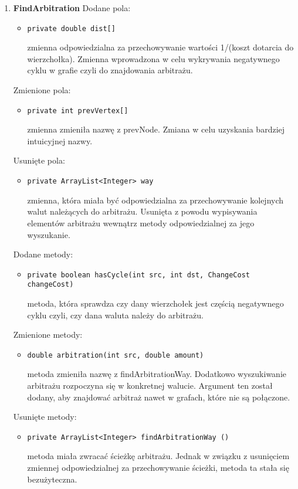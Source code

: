 \documentclass[12pt]{article}
\begin{document}
\begin{enumerate}
\item \textbf{FindArbitration}
\newline\newline
   Dodane pola:
    \begin{itemize}
        \item \begin{verbatim}private double dist[]\end{verbatim}
        zmienna odpowiedzialna za przechowywanie wartości 1/(koszt dotarcia do wierzchołka). Zmienna wprowadzona w celu wykrywania negatywnego cyklu w grafie czyli do znajdowania arbitrażu.
    \end{itemize}
    Zmienione pola:
    \begin{itemize}
    \item \begin{verbatim}private int prevVertex[]\end{verbatim}
        zmienna zmieniła nazwę z prevNode. Zmiana w celu uzyskania bardziej intuicyjnej nazwy.
    \end{itemize}
    Usunięte pola:
     \begin{itemize}
     \item \begin{verbatim}private ArrayList<Integer> way\end{verbatim}
        zmienna, która miała być odpowiedzialna za przechowywanie kolejnych walut należących do arbitrażu. Usunięta z powodu wypisywania elementów arbitrażu wewnątrz metody odpowiedzialnej za jego wyszukanie.
    \end{itemize}
    Dodane metody:
    \begin{itemize}
     \item \begin{verbatim}private boolean hasCycle(int src, int dst, ChangeCost changeCost)\end{verbatim}
        metoda, która sprawdza czy dany wierzchołek jest częścią negatywnego cyklu czyli, czy dana waluta należy do arbitrażu.
    \end{itemize}
    Zmienione metody:
    \begin{itemize}
     \item \begin{verbatim}double arbitration(int src, double amount)\end{verbatim}
        metoda zmieniła nazwę z findArbitrationWay. Dodatkowo wyszukiwanie arbitrażu rozpoczyna się w konkretnej walucie. Argument ten został dodany, aby znajdować arbitraż nawet w grafach, które nie są połączone.
    \end{itemize}
    Usunięte metody:
    \begin{itemize}
     \item \begin{verbatim}private ArrayList<Integer> findArbitrationWay ()\end{verbatim}
        metoda miała zwracać ścieżkę arbitrażu. Jednak w związku z usunięciem zmiennej odpowiedzialnej za przechowywanie ścieżki, metoda ta stała się bezużyteczna.
    \end{itemize}


\end{enumerate}
\end{document}
